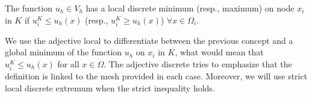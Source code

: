  \begin{definition}
	 The function $u_h\in V_h$ has a local discrete minimum (resp., maximum)  on node $x_i$ in $K$ if $u_i^K \leq u_h(x)$ (resp., $u_i^K \geq u_h(x)$) $\forall x\in \Omega_i$.
 \end{definition}
{
\begin{remark}
We use the adjective local to differentiate between the previous concept and a global minimum of the function $u_h$ on $x_i$ in $K$, what would mean that $u_i^K\leq u_h(x)$ for all $x\in \Omega$. The adjective discrete tries to emphasize that the definition is linked to the mesh provided in each case. Moreover, we will use strict local discrete extremum when the strict inequality holds.
\end{remark} }


